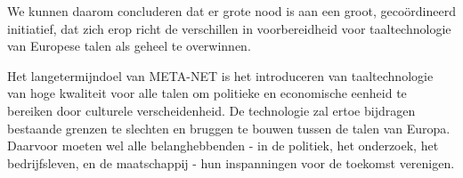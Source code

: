 \begin{multicols}{2}
    We kunnen daarom concluderen dat er grote nood is aan een groot, geco{\"o}rdineerd initiatief, dat zich erop richt de verschillen in voorbereidheid voor taaltechnologie van Europese talen als geheel te overwinnen.

    Het langetermijndoel van META-NET is het introduceren van taaltechnologie van hoge kwaliteit voor alle talen om politieke en economische eenheid te bereiken door culturele verscheidenheid. De technologie zal ertoe bijdragen bestaande grenzen te slechten en bruggen te bouwen tussen de talen van Europa. Daarvoor moeten wel alle belanghebbenden - in de politiek, het onderzoek, het bedrijfsleven, en de maatschappij - hun inspanningen voor de toekomst verenigen.
\end{multicols}

\clearpage

